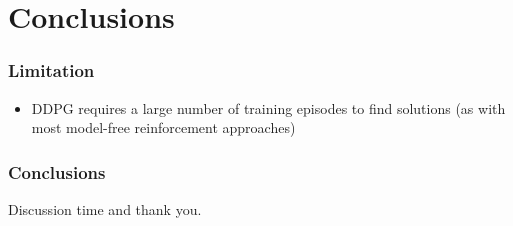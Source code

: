 \section{Conclusions}

\begin{frame}
\frametitle{Limitation}
\begin{itemize}
  \item DDPG requires a large number of training episodes to find solutions
  (as with most model-free reinforcement approaches)
\end{itemize}
\end{frame}

\begin{frame}
\frametitle{Conclusions}

\end{frame}

\begin{frame}
\Huge{\centerline{Discussion time and thank you.}}
\end{frame}
